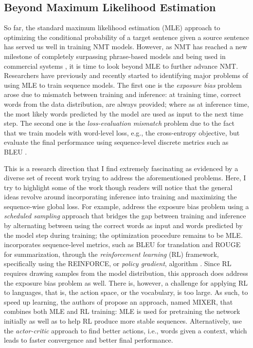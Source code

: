 \subsection{Beyond Maximum Likelihood Estimation}
So far, the standard maximum likelihood estimation (MLE) approach 
to optimizing the conditional probability of a target sentence given a source sentence 
has served us well in training NMT models. However, as NMT has reached a new milestone of completely surpassing phrase-based models and being used in commercial systems \cite{gnmt16,systran16}, it is time to look beyond MLE to further advance NMT. Researchers have previously and recently started to identifying major problems of using MLE to train sequence models. The first one is the {\it exposure bias} problem \cite{bengio15} arose due to mismatch between training and inference: at training time, correct words from the data distribution, are always provided; where as at inference time, the most likely words predicted by the model are used as input to the next time step. The second one is the {\it loss-evaluation mismatch} problem \cite{ranzato16} due to the fact that we train models with word-level loss, e.g., the cross-entropy objective, but evaluate the final performance using sequence-level discrete metrics such as BLEU \cite{Papineni02bleu}. 

This is a research direction that I find extremely fascinating as evidenced by a diverse set of recent work trying to address the aforementioned problems. Here, I try to  highlight some of the work though readers will notice that the general ideas revolve around incorporating inference into training and maximizing the sequence-wise global loss. For example,  address the exposure bias problem using a {\it scheduled sampling} approach that bridges the gap between training and inference by alternating between using the correct words as input and words predicted by the model step during training; the optimization procedure remains to be MLE.  incorporates sequence-level metrics, such as BLEU for translation and ROUGE for summarization, through the {\it reinforcement learning} (RL) framework, specifically using the REINFORCE, or {\it policy gradient}, algorithm \cite{reinforce}. Since RL requires drawing samples from the model distribution, this approach does address the exposure bias problem as well. There is, however, a challenge for applying RL to languages, that is, the action space, or the vocabulary, is too large. As such, to speed up learning, the authors of \cite{ranzato16} propose an approach, named MIXER, that combines both MLE and RL training: MLE is used for pretraining the network initially as well as to help RL produce more stable sequences. Alternatively,  use the {\it actor-critic} approach to find better actions, i.e., words given a context, which leads to faster convergence and better final performance.

